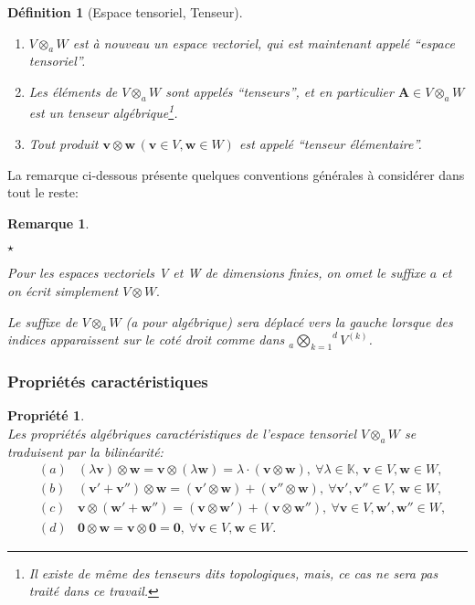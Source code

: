 \documentclass[11pt,a4paper,oneside]{book}
\newtheorem{defi}{Définition}[chapter]
\newtheorem{propp}{Propriété}[chapter]
\newtheorem{rem}{Remarque}[chapter]
\def\K{\mathbb K}
\def\agktensor{_{a}\overset{d}{\underset{k=1}{\bigotimes}}}
\def\v{\mathbf v}
\def\w{\mathbf w}
\newcommand{\mbf}[1]{\mathbf{#1}}
\begin{document}
\begin{defi}[Espace tensoriel, Tenseur]\label{defi1.20}
	\emph{\\}
	\begin{enumerate}
		\item[$ (a) $]
		$ V\otimes_{a} W $  est à nouveau un espace vectoriel, qui est maintenant appelé \textquotedblleft espace tensoriel\textquotedblright.
		\item[$ (b) $]
		Les éléments de $ V\otimes_{a} W $ sont appelés \textquotedblleft tenseurs\textquotedblright, et en particulier $ \mathbf{A}\in V\otimes_{a} W $ est un tenseur algébrique\footnote{Il existe de même des tenseurs  dits \textit{topologiques}, mais, ce cas ne sera pas traité dans ce travail.}.
		\item[$ (c) $]
		Tout produit $ \v\otimes \w \,(\v\in V, \w\in W)$ est appelé \textquotedblleft tenseur élémentaire\textquotedblright.
	\end{enumerate}
\end{defi}
La remarque ci-dessous présente quelques conventions générales à considérer dans tout le reste:
\begin{rem}
	\emph{\\}
	\begin{list}{$\star$}{}
		\item
		Pour les espaces vectoriels V et W de dimensions finies, on omet le suffixe $ a $ et on écrit simplement $ V\otimes W. $ 
		\item
Le suffixe de  $ V\otimes_{a} W $ (a pour algébrique) sera déplacé vers la gauche lorsque des indices apparaissent sur le coté droit comme dans $  \agktensor V^{(k)}$.
	\end{list}
\end{rem}

\subsubsection{Propriétés caractéristiques}
\begin{propp}\label{lem3.11}
	\emph{\\}
	Les propriétés algébriques caractéristiques de l'espace tensoriel $V\otimes_{a} W  $ se traduisent par la bilinéarité:
	\begin{eqnarray}\label{3.13}
	&(a)&(\lambda \v)\otimes \w=\v\otimes(\lambda \w)=\lambda\cdot(\v\otimes \w),\: \forall\lambda\in \K,\, \v\in V,\w\in W,\nonumber\\
	&(b)&(\v'+\v'')\otimes \w= (\v'\otimes \w)+(\v''\otimes \w),\:\forall \v', \v''\in V,\, \w\in W,\nonumber\\
	&(c)&\v\otimes(\w'+\w'')=(\v\otimes \w')+(\v\otimes \w''),\:\forall \v\in V, \w',\w''\in W,\\
	&(d)&\mbf{0}\otimes \w=\v\otimes \mbf{0}=\mbf{0},\:\forall \v\in V, \w\in W.\nonumber
	\end{eqnarray}
\end{propp}
\end{document}
